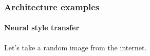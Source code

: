 \documentclass[9pt]{beamer}
\begin{document}



\begin{frame}
  \frametitle{Architecture examples}

  \framesubtitle{Neural style transfer}

  Let's take a random image from the internet.

  \begin{center}
  \end{center}
\end{frame}
\end{document}
